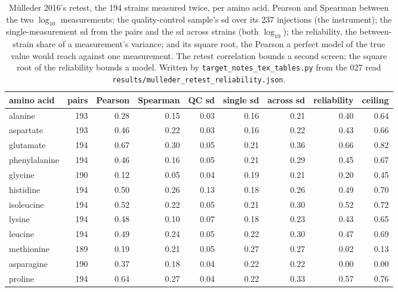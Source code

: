 \begin{table}[H]
  \centering
  \footnotesize
  \caption[M\"ulleder 2016 retest and the model ceiling]{M\"ulleder 2016's retest, the 194 strains measured twice, per amino acid. Pearson and Spearman between the two $\log_{10}$ measurements; the quality-control sample's sd over its 237 injections (the instrument); the single-measurement sd from the pairs and the sd across strains (both $\log_{10}$); the reliability, the between-strain share of a measurement's variance; and its square root, the Pearson a perfect model of the true value would reach against one measurement. The retest correlation bounds a second screen; the square root of the reliability bounds a model. Written by \texttt{target\_notes\_tex\_tables.py} from the 027 read \texttt{results/mulleder\_retest\_reliability.json}.}
  \label{tab:mulleder-retest}
  \begin{tabular}{@{}lrrrrrrrr@{}}
    \hline
    amino acid & pairs & Pearson & Spearman & QC sd & single sd & across sd & reliability & ceiling \\
    \hline
    alanine & 193 & 0.28 & 0.15 & 0.03 & 0.16 & 0.21 & 0.40 & 0.64 \\
    aspartate & 193 & 0.46 & 0.22 & 0.03 & 0.16 & 0.22 & 0.43 & 0.66 \\
    glutamate & 194 & 0.67 & 0.30 & 0.05 & 0.21 & 0.36 & 0.66 & 0.82 \\
    phenylalanine & 194 & 0.46 & 0.16 & 0.05 & 0.21 & 0.29 & 0.45 & 0.67 \\
    glycine & 190 & 0.12 & 0.05 & 0.04 & 0.19 & 0.21 & 0.20 & 0.45 \\
    histidine & 194 & 0.50 & 0.26 & 0.13 & 0.18 & 0.26 & 0.49 & 0.70 \\
    isoleucine & 194 & 0.52 & 0.22 & 0.05 & 0.21 & 0.30 & 0.52 & 0.72 \\
    lysine & 194 & 0.48 & 0.10 & 0.07 & 0.18 & 0.23 & 0.43 & 0.65 \\
    leucine & 194 & 0.49 & 0.24 & 0.05 & 0.22 & 0.30 & 0.47 & 0.69 \\
    methionine & 189 & 0.19 & 0.21 & 0.05 & 0.27 & 0.27 & 0.02 & 0.13 \\
    asparagine & 190 & 0.37 & 0.18 & 0.04 & 0.22 & 0.22 & 0.00 & 0.00 \\
    proline & 194 & 0.64 & 0.27 & 0.04 & 0.22 & 0.33 & 0.57 & 0.76 \\

\end{tabular}
\end{table}
